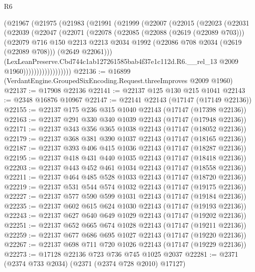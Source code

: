 \begin{lexlean}{R6}
\begin{coremodule}
            (@21967
              (@21975
                (@21983
                  (@21991
                    (@21999
                      (@22007
                        (@22015
                          (@22023
                            (@22031
                              (@22039
                                (@22047
                                  (@22071
                                    (@22078
                                      (@22085
                                        (@22088 (@2619 (@22089 @703)))
                                        (@22079
                                          @716
                                          @150
                                          @2213
                                          @2213
                                          @2034
                                          @1992
                                          (@22086 @708 @2034 (@2619 (@22089 @708)))
                                          (@2649 @22061)))
                                      (LexLeanPreserve.Cbd744c1ab127261585bab4f37e1c112d.R6.__rel_13
                                        @2009
                                        @1960))))))))))))))))))
@22136 := @16899 (VerdantEngine.GroupedSixEncoding.Request.threeImproves @2009 @1960)
@22137 := @17908 @22136
@22141 := @22137 @125 @130 @215 @1041
@22143 := @2348 @16876 @10967
@22147 := @22141 @22143 (@17147 (@17149 @22136))
@22155 := @22137 @175 @236 @315 @1040 @22143 (@17147 (@17398 @22136))
@22163 := @22137 @291 @330 @340 @1039 @22143 (@17147 (@17948 @22136))
@22171 := @22137 @343 @356 @365 @1038 @22143 (@17147 (@18052 @22136))
@22179 := @22137 @368 @381 @390 @1037 @22143 (@17147 (@18165 @22136))
@22187 := @22137 @393 @406 @415 @1036 @22143 (@17147 (@18287 @22136))
@22195 := @22137 @418 @431 @440 @1035 @22143 (@17147 (@18418 @22136))
@22203 := @22137 @443 @452 @461 @1034 @22143 (@17147 (@18558 @22136))
@22211 := @22137 @464 @485 @528 @1033 @22143 (@17147 (@18720 @22136))
@22219 := @22137 @531 @544 @574 @1032 @22143 (@17147 (@19175 @22136))
@22227 := @22137 @577 @590 @599 @1031 @22143 (@17147 (@19184 @22136))
@22235 := @22137 @602 @615 @624 @1030 @22143 (@17147 (@19193 @22136))
@22243 := @22137 @627 @640 @649 @1029 @22143 (@17147 (@19202 @22136))
@22251 := @22137 @652 @665 @674 @1028 @22143 (@17147 (@19211 @22136))
@22259 := @22137 @677 @686 @695 @1027 @22143 (@17147 (@19220 @22136))
@22267 := @22137 @698 @711 @720 @1026 @22143 (@17147 (@19229 @22136))
@22273 := @17128 @22136 @723 @736 @745 @1025 @2037
@22281 := @2371 (@2374 @733 @2034) (@2371 (@2374 @728 @2010) @17127)

\end{coremodule}
\end{lexlean}
